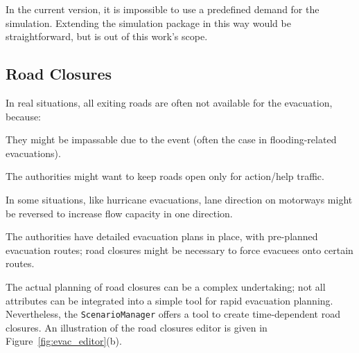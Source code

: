 In the current version, it is impossible to use a predefined demand for the simulation. Extending the simulation package in this way would be straightforward, but is out of this work's scope.

\subsection{Road Closures}
In real situations, all exiting roads are often not available for the evacuation, because:
\begin{compactitem}
\item They might be impassable due to the event (often the case in flooding-related evacuations).
\item The authorities might want to keep roads open only for action/help traffic.
\item In some situations, like hurricane evacuations, lane direction on motorways might be reversed to increase flow capacity in one direction.
\item The authorities have detailed evacuation plans in place, with pre-planned evacuation routes; road closures might be necessary to force evacuees onto certain routes.
\end{compactitem}
The actual planning of road closures can be a complex undertaking; not all attributes can be integrated into a simple tool for rapid evacuation planning. Nevertheless, the \lstinline|ScenarioManager| offers a tool to create time-dependent road closures. An illustration of the road closures editor is given in Figure~\ref{fig:evac_editor}(b).

